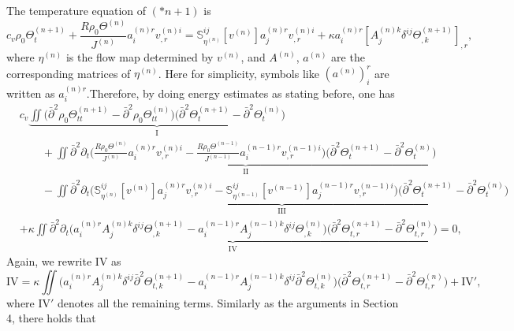 \documentclass[12pt,a4paper]{amsart}
\numberwithin{equation}{section}
\theoremstyle{plain}
\theoremstyle{definition}
\newcommand{\bpartial}{\bar{\partial}}
\begin{document}
The temperature equation of $(*n+1)$ is 
\begin{equation*} 
c_v \rho_0\Theta^{(n+1)}_t +\frac{R\rho_0\Theta^{(n)}}{J^{(n)}}a^{(n)r}_iv^{(n)i}_{,r}=  \mathbb{S}^{ij}_{\eta^{(n)}}[v^{(n)}]a^{(n)r}_jv^{(n)i}_{,r}
+\kappa a^{(n)r}_i [A^{(n)k}_j \delta^{ij} \Theta^{(n+1)}_{,k}]_{,r},
\end{equation*}
where $\eta^{(n)}$ is the flow map determined by $v^{(n)}$, and $A^{(n)}$, $a^{(n)}$ are the corresponding matrices of $\eta^{(n)}$. Here for simplicity, symbols like   $(a^{(n)})^r_i$ are written as $a^{(n)r}_i$.Therefore, by doing energy estimates as stating before, one has
\begin{align*}
& c_v\underbrace{\iint  \Big(\bpartial ^2\rho_0\Theta^{(n+1)}_{tt}-\bpartial ^2\rho_0\Theta^{(n)}_{tt}\Big)\Big( \bpartial^2\Theta^{(n+1)}_t-\bpartial^2\Theta^{(n)}_t\Big)}_{\mathrm{I}}\\
&\qquad+\underbrace{\iint  \bpartial^2 \partial_t \Big(\frac{R\rho_0\Theta^{(n)}}{J^{(n)}}a^{(n)r}_iv^{(n)i}_{,r}-\frac{R\rho_0\Theta^{(n-1)}}{J^{(n-1)}}a^{(n-1)r}_iv^{(n-1)i}_{,r}\Big) \Big( \bpartial^2\Theta^{(n+1)}_t-\bpartial^2\Theta^{(n)}_t\Big)}_{\mathrm{II}}\\
&\qquad-\underbrace{\iint \bpartial^2 \partial_t \Big(\mathbb{S}^{ij}_{\eta^{(n)}}[v^{(n)}]a^{(n)r}_jv^{(n)i}_{,r}-\mathbb{S}^{ij}_{\eta^{(n-1)}}[v^{(n-1)}]a^{(n-1)r}_jv^{(n-1)i}_{,r}\Big)\Big( \bpartial^2\Theta^{(n+1)}_t-\bpartial^2\Theta^{(n)}_t\Big)}_{\mathrm{III}}\\
&+\underbrace{\kappa\iint \bpartial^2 \partial_t\Big(a^{(n)r}_iA^{(n)k}_j \delta^{ij} \Theta^{(n+1)}_{,k}-a^{(n-1)r}_iA^{(n-1)k}_j \delta^{ij} \Theta^{(n)}_{,k}\Big)\Big(\bpartial^2 \Theta^{(n+1)}_{t,r}-\bpartial^2\Theta^{(n)}_{t,r}\Big)}_{\mathrm{IV}}=0,
\end{align*}
Again, we rewrite $\mathrm{IV}$ as 
\begin{equation*}
\mathrm{IV}=\kappa \iint \Big(a^{(n)r}_iA^{(n)k}_j \delta^{ij} \bpartial^2 \Theta^{(n+1)}_{t,k}-a^{(n-1)r}_iA^{(n-1)k}_j \delta^{ij} \bpartial^2 \Theta^{(n)}_{t,k}\Big)\Big( \bpartial^2\Theta^{(n+1)}_{t,r}-\bpartial^2\Theta^{(n)}_{t,r}\Big)
+\mathrm{IV}',
\end{equation*}
where $\mathrm{IV}'$ denotes all the remaining terms.
Similarly as the arguments in Section 4, there holds that
\end{document}

